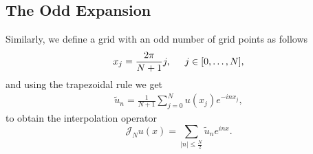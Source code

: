 	\subsection{The Odd Expansion}
	
	Similarly, we define a grid with an odd number of grid points as follows
	\begin{align*}
        x_j = \frac{2 \pi}{N + 1} j , \hspace{0.5cm} j\in [0, \dots , N],
    \end{align*}
    and using the trapezoidal rule we get
	\begin{align}
	\label{coefficients_JN}
        \widetilde{u}_n = \frac{1}{N + 1}  \displaystyle \sum_{j = 0}^{N} u(x_j) e^{-in x_j},
    \end{align}
    to obtain the interpolation operator
    \begin{equation}
    \label{Interpolation_operator_odd}
    	\mathcal{J}_N u(x) =  \displaystyle \sum_{ |n| \leq \frac {N}{2}} \widetilde{u}_n e^{inx}.
	\end{equation}
	
